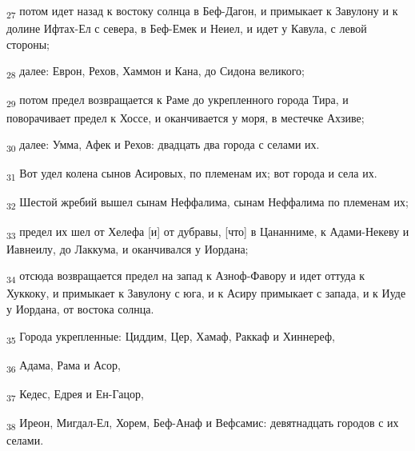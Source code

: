 \begin{tcolorbox}
\textsubscript{27} потом идет назад к востоку солнца в Беф-Дагон, и примыкает к Завулону и к долине Ифтах-Ел с севера, в Беф-Емек и Неиел, и идет у Кавула, с левой стороны;
\end{tcolorbox}
\begin{tcolorbox}
\textsubscript{28} далее: Еврон, Рехов, Хаммон и Кана, до Сидона великого;
\end{tcolorbox}
\begin{tcolorbox}
\textsubscript{29} потом предел возвращается к Раме до укрепленного города Тира, и поворачивает предел к Хоссе, и оканчивается у моря, в местечке Ахзиве;
\end{tcolorbox}
\begin{tcolorbox}
\textsubscript{30} далее: Умма, Афек и Рехов: двадцать два города с селами их.
\end{tcolorbox}
\begin{tcolorbox}
\textsubscript{31} Вот удел колена сынов Асировых, по племенам их; вот города и села их.
\end{tcolorbox}
\begin{tcolorbox}
\textsubscript{32} Шестой жребий вышел сынам Неффалима, сынам Неффалима по племенам их;
\end{tcolorbox}
\begin{tcolorbox}
\textsubscript{33} предел их шел от Хелефа [и] от дубравы, [что] в Цананниме, к Адами-Некеву и Иавнеилу, до Лаккума, и оканчивался у Иордана;
\end{tcolorbox}
\begin{tcolorbox}
\textsubscript{34} отсюда возвращается предел на запад к Азноф-Фавору и идет оттуда к Хуккоку, и примыкает к Завулону с юга, и к Асиру примыкает с запада, и к Иуде у Иордана, от востока солнца.
\end{tcolorbox}
\begin{tcolorbox}
\textsubscript{35} Города укрепленные: Циддим, Цер, Хамаф, Раккаф и Хиннереф,
\end{tcolorbox}
\begin{tcolorbox}
\textsubscript{36} Адама, Рама и Асор,
\end{tcolorbox}
\begin{tcolorbox}
\textsubscript{37} Кедес, Едрея и Ен-Гацор,
\end{tcolorbox}
\begin{tcolorbox}
\textsubscript{38} Иреон, Мигдал-Ел, Хорем, Беф-Анаф и Вефсамис: девятнадцать городов с их селами.
\end{tcolorbox}
